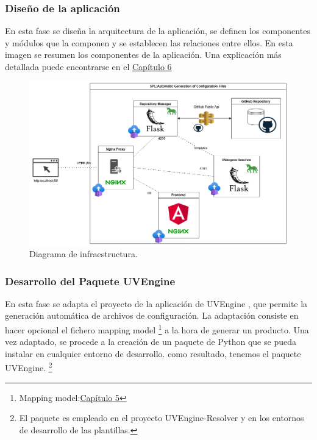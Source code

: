 \documentclass[12pt, a4paper, twoside]{article}
\begin{document}
\newpage 
\subsubsection{Diseño de la aplicación}
En esta fase se diseña la arquitectura de la aplicación, se definen los componentes y módulos que la componen y se establecen las relaciones entre ellos. 
En esta imagen se resumen los componentes de la aplicación. Una explicación más detallada puede encontrarse en el \hyperref[sec:Arquitectura y Descripción del sistema]{Capítulo 6}
\begin{figure}[h]
	\centering
		\includegraphics[width=1\textwidth]{Arquitectura Contenedores.png}
	\caption{Diagrama de infraestructura.} 
\end{figure}
\subsubsection{Desarrollo del Paquete UVEngine}
En esta fase se adapta el proyecto de la aplicación de UVEngine \cite{uvengine_github}, que permite la generación automática de archivos de configuración.
La adaptación consiste en hacer opcional el fichero mapping model \footnote{Mapping model:\hyperref[sec:Mapping Model]{Capítulo 5}} a la hora de generar un producto. Una vez adaptado, se procede a la creación de un paquete de Python que se pueda instalar en cualquier entorno de desarrollo.
como resultado, tenemos el paquete UVEngine. \cite{uvengine_pypi}\footnote{El paquete es empleado en el proyecto UVEngine-Resolver y en los entornos de desarrollo de las plantillas.}
\end{document}
